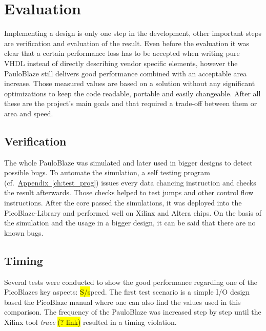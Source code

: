 \chapter{Evaluation}
\label{ch:res}
Implementing a design is only one step in the development, other important steps are verification and evaluation of the result.
Even before the evaluation it was clear that a certain performance loss has to be accepted when writing pure VHDL instead of directly describing vendor specific elements, however the PauloBlaze still delivers good performance combined with an acceptable area increase.
Those measured values are based on a solution without any significant optimizations to keep the code readable, portable and easily changeable.
After all these are the project's main goals and that required a trade-off between them or area and speed.


\section{Verification}
\label{sec:verifi}
The whole PauloBlaze was simulated and later used in bigger designs to detect possible bugs.
To automate the simulation, a self testing program (cf.~\hyperref[{ch:test_prog}]{Appendix~\ref*{ch:test_prog}}) issues every data chancing instruction and checks the result afterwards.
Those checks helped to test jumps and other control flow instructions.
After the core passed the simulations, it was deployed into the PicoBlaze-Library \cite{picoLib} and performed well on Xilinx and Altera chips.
On the basis of the simulation and the usage in a bigger design, it can be said that there are no known bugs.

\section{Timing}
\label{sec:timing}
Several tests were conducted to show the good performance regarding one of the PicoBlazes key aspects: \hl{S/s}peed.
The first test scenario is a simple I/O design based the PicoBlaze manual \cite[p.\,72]{KCPSM6} where one can also find the values used in this comparison.
The frequency of the PauloBlaze was increased step by step until the Xilinx tool \emph{trace} \hl{(? link)} resulted in a timing violation.

